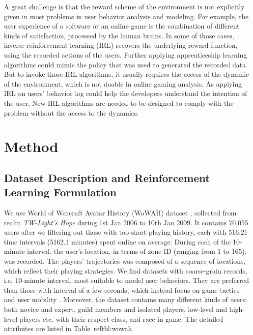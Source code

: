 \documentclass{sigchi}
\begin{document}
A great challenge is that the reward scheme of the environment is not explicitly given in most problems in user behavior analysis and modeling.
For example, the user experience of a software or an online game is the combination of different kinds of satisfaction, processed by the human brains.
In some of those cases, inverse reinforcement learning (IRL) \cite{ratliff2006maximum,ng2000algorithms} recovers the underlying reward function, using the recorded actions of the users.
Further applying apprenticeship learning algorithms \cite{abbeel2004apprenticeship} could mimic the policy that was used to generated the recorded data.
But to invoke those IRL algorithms, it usually requires the access of the dynamic of the environment, which is not doable in online gaming analysis.
As applying IRL on users' behavior log could help the developers understand the intention of the user, New IRL algorithms are needed to be designed to comply with the problem without the access to the dynamics.

\section{Method}

\subsection{Dataset Description and Reinforcement Learning Formulation}

We use World of Warcraft Avatar History (WoWAH) dataset \cite{lee2011world}, collected from realm \textit{TW-Light's Hope} during 1st Jan 2006 to 10th Jan 2009.
It contains 70,055 users after we filtering out those with too short playing history, each with 516.21 time intervals (5162.1 minutes) spent online on average.
During each of the 10-minute interval, the user's location, in terms of zone ID (ranging from 1 to 165), was recorded.
The players' trajectories was composed of a sequence of locations, which reflect their playing strategies.
We find datasets with coarse-grain records, i.e. 10-minute interval, most suitable to model user behaviors.
They are preferred than those with interval of a few seconds, which instead focus on game tactics and user mobility \cite{Bell2013a,shen2014characterization}.
Moreover, the dataset contains many different kinds of users: both novice and expert, guild members and isolated players, low-level and high-level players etc. with their respect class, and race in game.
The detailed attributes are listed in Table~ref{tbl:wowah}.
\end{document}
